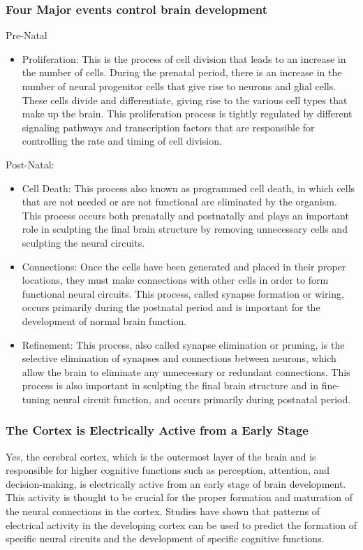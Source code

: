 \begin{itemize}
\begin{itemize}
\subsubsection{Four Major events control brain development}
\begin{itemize}
Pre-Natal
\begin{itemize}
    \item 
Proliferation: This is the process of cell division that leads to an increase in the number of cells. During the prenatal period, there is an increase in the number of neural progenitor cells that give rise to neurons and glial cells. These cells divide and differentiate, giving rise to the various cell types that make up the brain. This proliferation process is tightly regulated by different signaling pathways and transcription factors that are responsible for controlling the rate and timing of cell division.
 
\end{itemize}
  Post-Natal:
  \begin{itemize}
   \item 
Cell Death: This process also known as programmed cell death, in which cells that are not needed or are not functional are eliminated by the organism. This process occurs both prenatally and postnatally and plays an important role in sculpting the final brain structure by removing unnecessary cells and sculpting the neural circuits.
    \item Connections: Once the cells have been generated and placed in their proper locations, they must make connections with other cells in order to form functional neural circuits. This process, called synapse formation or wiring, occurs primarily during the postnatal period and is important for the development of normal brain function.

    \item Refinement: This process, also called synapse elimination or pruning, is the selective elimination of synapses and connections between neurons, which allow the brain to eliminate any unnecessary or redundant connections. This process is also important in sculpting the final brain structure and in fine-tuning neural circuit function, and occurs primarily during postnatal period.
  \end{itemize}
\end{itemize}

\subsubsection{The Cortex is Electrically Active from a Early Stage}
Yes, the cerebral cortex, which is the outermost layer of the brain and is responsible for higher cognitive functions such as perception, attention, and decision-making, is electrically active from an early stage of brain development. This activity is thought to be crucial for the proper formation and maturation of the neural connections in the cortex. Studies have shown that patterns of electrical activity in the developing cortex can be used to predict the formation of specific neural circuits and the development of specific cognitive functions.

\end{itemize}
\end{itemize}
